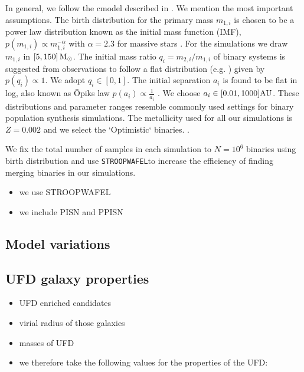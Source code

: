 \documentclass[a4paper,fleqn,usenatbib,useAMS,usedcolumn]{mnras}
\newcommand{\AISs}{\texttt{STROOPWAFEL}}%
\begin{document}
In general, we follow the cmodel described in \citet{vigna2018formation}. We mention the most important assumptions. 
The birth distribution for the primary mass $m_{1,i}$ is chosen to be a power law distribution known as the initial mass function (IMF), $p(m_{1,i}) \propto  m_{1,i}^{-\alpha}$ with $\alpha = 2.3$ for massive stars \citep{kroupa2001variation}. For the simulations we draw $m_{1,i} $ in $[5,150] \, \rm{M}_{\odot}$. 
The initial mass ratio $q_i = m_{2,i} / m_{1,i} $ of binary systems is suggested from observations to follow a flat distribution (e.g. \citealt{tout1991relation,mazeh1992mass, goldberg1994mass, sana2012binary}) given by $p(q_i) \propto  1$. We adopt $q_i \in [0,1]$. 
The initial separation $a_i$ is found to be flat in log, also known as \"{O}piks law  $p(a_i) \propto \frac{1 }{a_i}$ \citep{opik1924statistical, 1983ARA&A..21..343A}. We choose $a_i \in [0.01, 1000] \rm{AU}$.  
These distributions and parameter ranges resemble commonly used settings for binary population synthesis simulations. The metallicity used for all our simulations is $Z = 0.002$ and we select the `Optimistic` binaries. . 

We fix the total number of samples in each simulation to $N =  10^6$ binaries using birth distribution and use   \AISs to increase the efficiency of finding merging binaries in our simulations. 

\begin{itemize}
	\item we use STROOPWAFEL
	\item we include PISN and PPISN 
\end{itemize}





\subsection{Model variations}

\subsection{UFD galaxy properties}
\begin{itemize}
	\item UFD enriched candidates
	\item virial radius of those galaxies
	\item masses of UFD
	\item we therefore take the following values for the properties of the UFD: 
\end{itemize}
\end{document}
